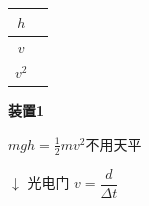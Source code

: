 
\begin{center}
\begin{tabular}{|c|p{6cm}|}
\hline
$h$ & \\
\hline
$v$ & \\
\hline
$v^2$ & \\
\hline
\end{tabular}
\end{center}

\textbf{装置1}


$mgh=\frac{1}{2}mv^2$\quad 不用天平

$\downarrow$ 光电门 $v=\dfrac{d}{\Delta t}$

